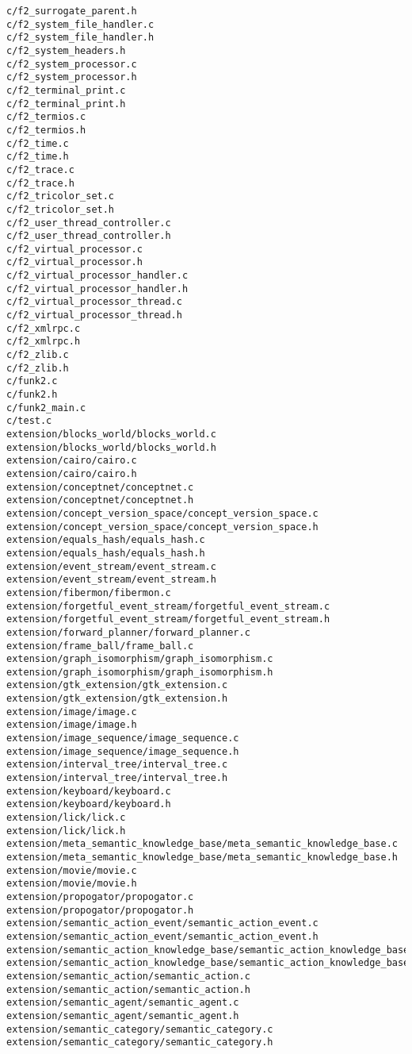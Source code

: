 \begin{lstlisting}
c/f2_surrogate_parent.h
c/f2_system_file_handler.c
c/f2_system_file_handler.h
c/f2_system_headers.h
c/f2_system_processor.c
c/f2_system_processor.h
c/f2_terminal_print.c
c/f2_terminal_print.h
c/f2_termios.c
c/f2_termios.h
c/f2_time.c
c/f2_time.h
c/f2_trace.c
c/f2_trace.h
c/f2_tricolor_set.c
c/f2_tricolor_set.h
c/f2_user_thread_controller.c
c/f2_user_thread_controller.h
c/f2_virtual_processor.c
c/f2_virtual_processor.h
c/f2_virtual_processor_handler.c
c/f2_virtual_processor_handler.h
c/f2_virtual_processor_thread.c
c/f2_virtual_processor_thread.h
c/f2_xmlrpc.c
c/f2_xmlrpc.h
c/f2_zlib.c
c/f2_zlib.h
c/funk2.c
c/funk2.h
c/funk2_main.c
c/test.c
extension/blocks_world/blocks_world.c
extension/blocks_world/blocks_world.h
extension/cairo/cairo.c
extension/cairo/cairo.h
extension/conceptnet/conceptnet.c
extension/conceptnet/conceptnet.h
extension/concept_version_space/concept_version_space.c
extension/concept_version_space/concept_version_space.h
extension/equals_hash/equals_hash.c
extension/equals_hash/equals_hash.h
extension/event_stream/event_stream.c
extension/event_stream/event_stream.h
extension/fibermon/fibermon.c
extension/forgetful_event_stream/forgetful_event_stream.c
extension/forgetful_event_stream/forgetful_event_stream.h
extension/forward_planner/forward_planner.c
extension/frame_ball/frame_ball.c
extension/graph_isomorphism/graph_isomorphism.c
extension/graph_isomorphism/graph_isomorphism.h
extension/gtk_extension/gtk_extension.c
extension/gtk_extension/gtk_extension.h
extension/image/image.c
extension/image/image.h
extension/image_sequence/image_sequence.c
extension/image_sequence/image_sequence.h
extension/interval_tree/interval_tree.c
extension/interval_tree/interval_tree.h
extension/keyboard/keyboard.c
extension/keyboard/keyboard.h
extension/lick/lick.c
extension/lick/lick.h
extension/meta_semantic_knowledge_base/meta_semantic_knowledge_base.c
extension/meta_semantic_knowledge_base/meta_semantic_knowledge_base.h
extension/movie/movie.c
extension/movie/movie.h
extension/propogator/propogator.c
extension/propogator/propogator.h
extension/semantic_action_event/semantic_action_event.c
extension/semantic_action_event/semantic_action_event.h
extension/semantic_action_knowledge_base/semantic_action_knowledge_base.c
extension/semantic_action_knowledge_base/semantic_action_knowledge_base.h
extension/semantic_action/semantic_action.c
extension/semantic_action/semantic_action.h
extension/semantic_agent/semantic_agent.c
extension/semantic_agent/semantic_agent.h
extension/semantic_category/semantic_category.c
extension/semantic_category/semantic_category.h

\end{lstlisting}
